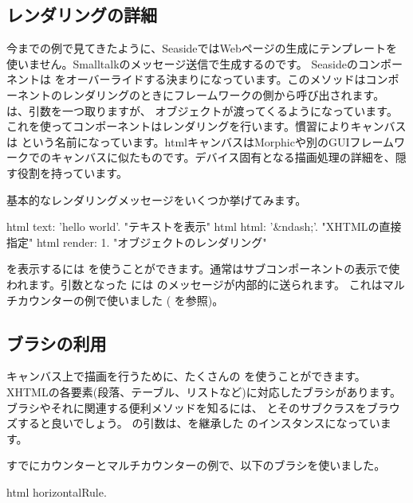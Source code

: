 \documentclass[a4paper,10pt,twoside]{book}
\begin{document}
\subsection{レンダリングの詳細}

今までの例で見てきたように、SeasideではWebページの生成にテンプレートを使いません。Smalltalkのメッセージ送信で生成するのです。
Seasideのコンポーネントは  をオーバーライドする決まりになっています。このメソッドはコンポーネントのレンダリングのときにフレームワークの側から呼び出されます。
 は、引数を一つ取りますが、  オブジェクトが渡ってくるようになっています。これを使ってコンポーネントはレンダリングを行います。慣習によりキャンバスは  という名前になっています。htmlキャンバスはMorphicや別のGUIフレームワークでのキャンバスに似たものです。デバイス固有となる描画処理の詳細を、隠す役割を持っています。

基本的なレンダリングメッセージをいくつか挙げてみます。
\begin{code}{}
html text: 'hello world'.  "テキストを表示"
html html: '&ndash;'.     "XHTMLの直接指定"
html render: 1.              "オブジェクトのレンダリング"
\end{code}

を表示するには  を使うことができます。通常はサブコンポーネントの表示で使われます。引数となった には のメッセージが内部的に送られます。
これはマルチカウンターの例で使いました ( を参照)。

\subsection{ブラシの利用}

キャンバス上で描画を行うために、たくさんの  を使うことができます。
XHTMLの各要素(段落、テーブル、リストなど)に対応したブラシがあります。
ブラシやそれに関連する便利メソッドを知るには、 とそのサブクラスをブラウズすると良いでしょう。
  の引数は、を継承した のインスタンスになっています。

すでにカウンターとマルチカウンターの例で、以下のブラシを使いました。
\begin{code}{}
html horizontalRule.
\end{code}
\end{document}
